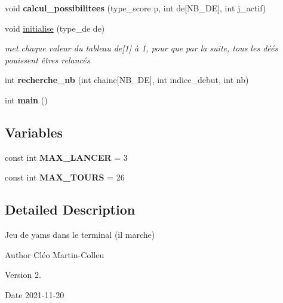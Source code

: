 \begin{DoxyCompactItemize}
\mbox{\label{yams___cleo___martin-_colleu__2_80_8c_a8fa4cb922c93d507fe405d4d87926b92}} 
void {\bfseries calcul\+\_\+possibilitees} (type\+\_\+score p, int de\mbox{[}N\+B\+\_\+\+DE\mbox{]}, int j\+\_\+actif)
\item 
void \mbox{\hyperlink{yams___cleo___martin-_colleu__2_80_8c_a792bcf389a25e2758894847d2feca6db}{initialise}} (type\+\_\+de de)
\begin{DoxyCompactList}\small\item\em met chaque valeur du tableau de\mbox{[}1\mbox{]} à 1, pour que par la suite, tous les déés pouissent êtres relancés \end{DoxyCompactList}\item 
\mbox{\label{yams___cleo___martin-_colleu__2_80_8c_ab36b94e49cc3f74dbd2642e61b98b966}} 
int {\bfseries recherche\+\_\+nb} (int chaine\mbox{[}N\+B\+\_\+\+DE\mbox{]}, int indice\+\_\+debut, int nb)
\item 
\mbox{\label{yams___cleo___martin-_colleu__2_80_8c_ae66f6b31b5ad750f1fe042a706a4e3d4}} 
int {\bfseries main} ()
\end{DoxyCompactItemize}
\subsection*{Variables}
\begin{DoxyCompactItemize}
\item 
\mbox{\label{yams___cleo___martin-_colleu__2_80_8c_aee98ad0feca70f669afd32300bb66f65}} 
const int {\bfseries M\+A\+X\+\_\+\+L\+A\+N\+C\+ER} = 3
\item 
\mbox{\label{yams___cleo___martin-_colleu__2_80_8c_a71e22abe29ad94a56fa7bfaa9c53a7d0}} 
const int {\bfseries M\+A\+X\+\_\+\+T\+O\+U\+RS} = 26
\end{DoxyCompactItemize}


\subsection{Detailed Description}
Jeu de yams dans le terminal (il marche) 

\begin{DoxyAuthor}{Author}
Cléo Martin-\/\+Colleu 
\end{DoxyAuthor}
\begin{DoxyVersion}{Version}
2. 
\end{DoxyVersion}
\begin{DoxyDate}{Date}
2021-\/11-\/20 
\end{DoxyDate}



